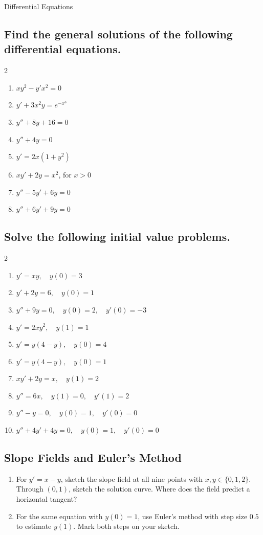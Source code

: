 \documentclass{article}
\begin{document}
\begin{center}
\begin{Huge}Differential Equations\end{Huge}
\end{center}


\subsection{Find the general solutions of the following differential equations.}

\begin{multicols}{2}
\begin{enumerate}
\item $xy^2-y'x^2=0$
\item $y'+3x^2y=e^{-x^3}$
\item $y''+8y+16=0$
\item $y''+4y=0$
\item $y'=2x(1+y^2)$
\item $xy'+2y=x^2$, for $x>0$
\item $y''-5y'+6y=0$
\item $y''+6y'+9y=0$
\end{enumerate}
\end{multicols}


\subsection{Solve the following initial value problems.}
\begin{multicols}{2}
\begin{enumerate}
\item $y'=xy,\quad y(0)=3$
\item $y'+2y=6,\quad y(0)=1$
\item $y''+9y=0,\quad y(0)=2,\quad y'(0)=-3$
\item $y'=2xy^2,\quad y(1)=1$
\item $y'=y(4-y),\quad y(0)=4$
\item $y'=y(4-y),\quad y(0)=1$
\item $xy'+2y=x,\quad y(1)=2$
\item $y''=6x,\quad y(1)=0,\quad y'(1)=2$
\item $y''-y=0,\quad y(0)=1,\quad y'(0)=0$
\item $y''+4y'+4y=0,\quad y(0)=1,\quad y'(0)=0$
\end{enumerate}
\end{multicols}

\subsection{Slope Fields and Euler's Method}
\begin{enumerate}
\item For $y'=x-y$, sketch the slope field at all nine points with $x,y\in\{0,1,2\}$. Through $(0,1)$, sketch the solution curve. Where does the field predict a horizontal tangent?
\item For the same equation with $y(0)=1$, use Euler's method with step size $0.5$ to estimate $y(1)$. Mark both steps on your sketch.
\end{enumerate}
\end{document}
